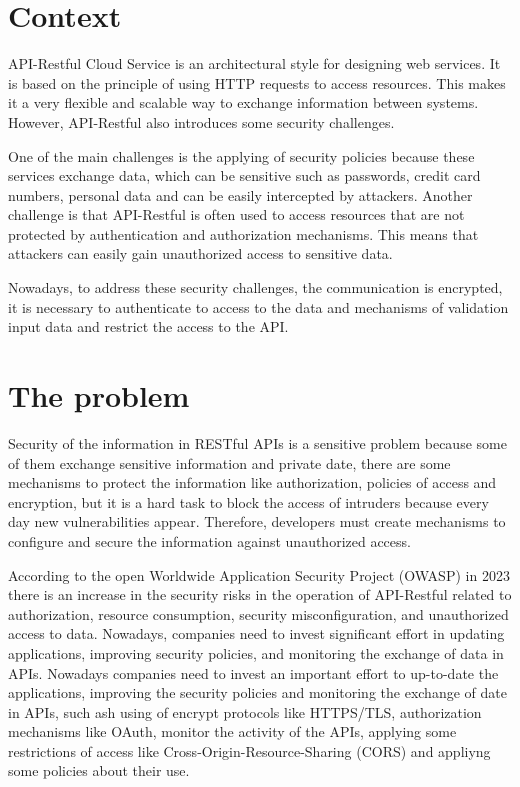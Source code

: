 \section{Context}

API-Restful Cloud Service is an architectural style for designing web services. It is based on the principle of using HTTP requests to access resources. This makes it a very flexible and scalable way to exchange information between systems. However, API-Restful also introduces some security challenges.

One of the main challenges is the applying of security policies because these services exchange data, which can be sensitive such as passwords, credit card numbers, personal data and can be easily intercepted by attackers. Another challenge is that API-Restful is often used to access resources that are not protected by authentication and authorization mechanisms. This means that attackers can easily gain unauthorized access to sensitive data.

Nowadays, to address these security challenges, the communication is encrypted, it is necessary to authenticate to access to the data and mechanisms of validation input data and restrict the access to the API.


\section{The problem}

Security of the information in RESTful APIs is a sensitive problem because some of them exchange sensitive information and private date, there are some mechanisms to protect the information like authorization, policies of access and encryption, but it is a hard task to block the access of intruders because every day new vulnerabilities appear.  Therefore, developers must create mechanisms to configure and secure the information against unauthorized access.

According to the open Worldwide Application Security Project (OWASP) in 2023 there is an increase in the security risks in the operation of API-Restful related to authorization, resource consumption, security misconfiguration, and unauthorized access to data. Nowadays, companies need to invest significant effort in updating applications, improving security policies, and monitoring the exchange of data in APIs. Nowadays companies need to invest an important effort to up-to-date the applications, improving the security policies and monitoring the exchange of date in APIs, such ash using of encrypt protocols like HTTPS/TLS, authorization mechanisms like OAuth, monitor the activity of the APIs, applying some restrictions of access like Cross-Origin-Resource-Sharing (CORS) and appliyng some policies about their use\cite{Riggs2023}.

